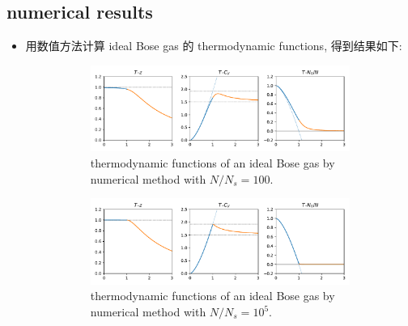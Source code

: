\subsection{numerical results}
\begin{itemize}
	\item 用数值方法计算 ideal Bose gas 的 thermodynamic functions, 得到结果如下:
	
	\begin{figure}[H]
		\centering
		\begin{subfigure}{1\linewidth}
			\centering
			\includegraphics[scale=0.6]{figures/thermodynamic functions of an ideal Bose gas by numerical method with N=100.pdf}
			\caption{thermodynamic functions of an ideal Bose gas by numerical method with $N / N_s = 100$.}
		\end{subfigure}
		\bigskip
		\begin{subfigure}{1\linewidth}
			\centering
			\includegraphics[scale=0.6]{figures/thermodynamic functions of an ideal Bose gas by numerical method with N=100000.pdf}
			\caption{thermodynamic functions of an ideal Bose gas by numerical method with $N / N_s = 10^5$.}
		\end{subfigure}
		\caption{}
	\end{figure}
\end{itemize}

